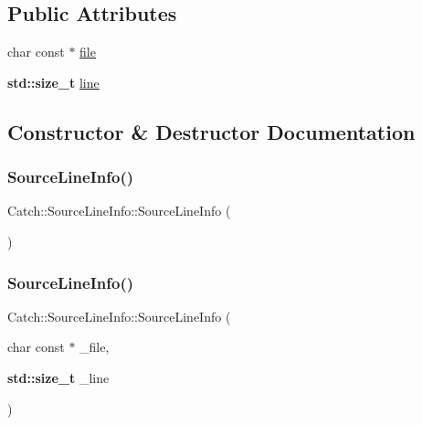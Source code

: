 \subsection*{Public Attributes}
\begin{DoxyCompactItemize}
\item 
char const  $\ast$ \hyperlink{struct_catch_1_1_source_line_info_ad65537703e9f08c1fa7777fbc3f0c617}{file}
\item 
\textbf{ std\+::size\+\_\+t} \hyperlink{struct_catch_1_1_source_line_info_a841e5d696c7b9cde24e45e61dd979c77}{line}
\end{DoxyCompactItemize}


\subsection{Constructor \& Destructor Documentation}
\mbox{\label{struct_catch_1_1_source_line_info_a9d44b2e1133794eee0bd5716424c83d6}} 
\subsubsection{\texorpdfstring{Source\+Line\+Info()}{SourceLineInfo()}\hspace{0.1cm}{\footnotesize\ttfamily [1/2]}}
{\footnotesize\ttfamily Catch\+::\+Source\+Line\+Info\+::\+Source\+Line\+Info (\begin{DoxyParamCaption}{ }\end{DoxyParamCaption})}

\mbox{\label{struct_catch_1_1_source_line_info_a6218cb890337d37f708ea94063958940}} 
\subsubsection{\texorpdfstring{Source\+Line\+Info()}{SourceLineInfo()}\hspace{0.1cm}{\footnotesize\ttfamily [2/2]}}
{\footnotesize\ttfamily Catch\+::\+Source\+Line\+Info\+::\+Source\+Line\+Info (\begin{DoxyParamCaption}\item[{char const $\ast$}]{\+\_\+file,  }\item[{\textbf{ std\+::size\+\_\+t}}]{\+\_\+line }\end{DoxyParamCaption})}



